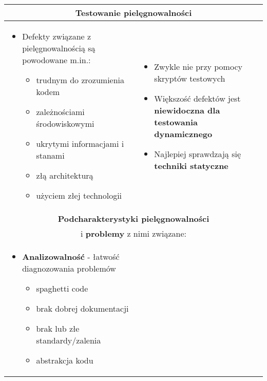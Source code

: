 \documentclass[../main.tex]{subfiles}
\begin{document}
    \begin{table}[H]
        \begin{center}
            \begin{tabular}{| p{8cm} | p{8cm} |}
                \hline
                \multicolumn{2}{|c|}{\textbf{Testowanie pielęgnowalności}} \\
                \hline
                \begin{itemize}
                    \item Defekty związane z pielęgnowalnością są powodowane m.in.:
                    \begin{itemize}
                        \item trudnym do zrozumienia kodem
                        \item zależnościami środowiskowymi
                        \item ukrytymi informacjami i stanami
                        \item złą architekturą
                        \item użyciem złej technologii
                    \end{itemize}
                \end{itemize}
                &
                \begin{itemize}
                    \item Zwykle nie przy pomocy skryptów testowych
                    \item Większość defektów jest \textbf{niewidoczna dla testowania dynamicznego}
                    \item Najlepiej sprawdzają się \textbf{techniki statyczne}
                \end{itemize} \\
                \hline
                \hline
                \multicolumn{2}{|c|}{\textbf{Podcharakterystyki pielęgnowalności}} \\
                \multicolumn{2}{|c|}{i \textbf{problemy} z nimi związane:} \\
                \hline
                \begin{itemize}
                    \item \textbf{Analizowalność} - łatwość diagnozowania problemów
                    \begin{itemize}
                        \item spaghetti code
                        \item brak dobrej dokumentacji
                        \item brak lub złe standardy/zalenia
                        \item abstrakcja kodu
                    \end{itemize}


\end{itemize}
\end{tabular}
\end{center}
\end{table}
\end{document}
